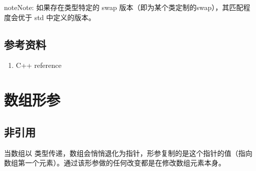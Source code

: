 \documentclass[letterpaper,10pt,english]{sphinxmanual}
\begin{document}
\begin{sphinxadmonition}{note}{Note:}
如果存在类型特定的 swap 版本（即为某个类定制的swap），其匹配程度会优于 std 中定义的版本。

%
\begin{sphinxVerbatim}[commandchars=\\\{\}]
  

    

  

  
\end{sphinxVerbatim}
\end{sphinxadmonition}


\subsection{参考资料}
\label{\detokenize{cpp/05_swap:id2}}\begin{enumerate}
\item {} 
C++ reference

\end{enumerate}
\begin{quote}

\end{quote}


\section{数组形参}
\label{\detokenize{cpp/06_arrayArg::doc}}\label{\detokenize{cpp/06_arrayArg:id1}}

\subsection{非引用}
\label{\detokenize{cpp/06_arrayArg:id2}}
当数组以  类型传递，数组会悄悄退化为指针，形参复制的是这个指针的值（指向数组第一个元素）。通过该形参做的任何改变都是在修改数组元素本身。
\end{document}
